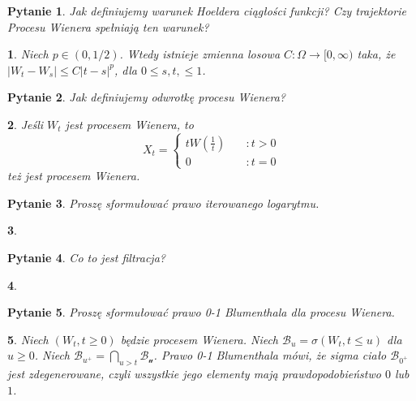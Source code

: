 \documentclass[10pt]{mwart}
\theoremstyle{plain}
\newtheorem{pytanie}{Pytanie}
\theoremstyle{break}
\newtheorem*{odpowiedź}{}
\begin{document}
\begin{pytanie}
Jak definiujemy warunek Hoeldera ciągłości funkcji? Czy trajektorie Procesu Wienera spełniają ten warunek?
\end{pytanie}
\begin{odpowiedź}
    Niech $p \in (0, 1/2)$. Wtedy istnieje zmienna losowa
    $C: \Omega \to [0, \infty)$ taka, że
    $|W_t - W_s| \leq  C|t - s|^p$, dla $0 \leq s, t, \leq 1$.
\end{odpowiedź}


\begin{pytanie}
Jak definiujemy odwrotkę procesu Wienera?
\end{pytanie}
\begin{odpowiedź}
    Jeśli $W_t$ jest procesem Wienera, to \[
    X_t = \begin{cases}
        tW\left(\frac 1 t\right) \quad &:t>0 \\
        0 \quad &: t = 0
        \end{cases}
    \] też jest procesem Wienera.
\end{odpowiedź}


\begin{pytanie}
Proszę sformułować prawo iterowanego logarytmu.
\end{pytanie}
\begin{odpowiedź}
\end{odpowiedź}


\begin{pytanie}
Co to jest filtracja?
\end{pytanie}
\begin{odpowiedź}
\end{odpowiedź}


\begin{pytanie}
Proszę sformułować prawo 0-1 Blumenthala dla procesu Wienera.
\end{pytanie}
\begin{odpowiedź}
    Niech $(W_t, t\geq 0)$ będzie procesem Wienera. Niech
    $\mathcal{B}_u = \sigma(W_t, t\leq u)$ dla $u \geq 0$.
    Niech $\mathcal{B}_{u^+} = \bigcap_{u > t} \mathcal{B_u}$.
    Prawo 0-1 Blumenthala mówi, że sigma ciało $ \mathcal{B_{0^+}}$
    jest zdegenerowane, czyli wszystkie jego elementy mają
    prawdopodobieństwo $0$ lub $1$.
\end{odpowiedź}
\end{document}
